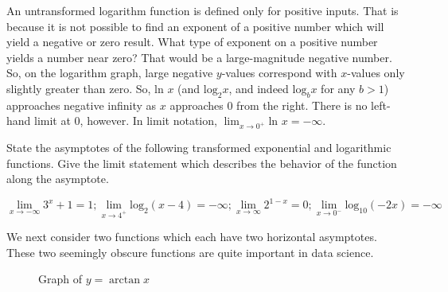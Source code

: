 An untransformed logarithm function is defined only for positive inputs. That is 
because it is not possible to find an exponent of a positive number which will 
yield a negative or zero result. What type of exponent on a positive number yields 
a number near zero? That would be a large-magnitude negative number. So, on the 
logarithm graph, large negative $y$-values correspond with $x$-values only slightly 
greater than zero. So, $\text{ln } x$ (and $\text{log}_2 x$, and indeed 
$\text{log}_b x$ for any $b > 1$) approaches negative infinity as $x$ approaches 
$0$ from the right. There is no left-hand limit at $0$, however. In limit notation, 
$\lim_{x \rightarrow 0^+} \text{ln } x = -\infty$.

\begin{Exercise}[title=Limits Practice 2, label=limits2]
  State the asymptotes of the following transformed exponential and logarithmic 
  functions. Give the limit statement which describes the behavior of the function 
  along the asymptote.
  \vspace{40mm}
\end{Exercise}
\begin{Answer}[ref=limits2] 
	$$ \lim_{x \rightarrow -\infty} 3^x + 1 = 1; \lim_{x \rightarrow 4^+} 
	\text{log}_2 (x-4) = -\infty; \lim_{x \rightarrow \infty} 2^{1-x} = 0; \lim_{x 
	\rightarrow 0^-} \text{log}_{10} (-2x) = -\infty $$
\end{Answer}

We next consider two functions which each have two horizontal asymptotes. These two 
seemingly obscure functions are quite important in data science.

\begin{figure}[htbp]
  \centering
  \caption{Graph of \(y = \arctan x\)}
\end{figure}

